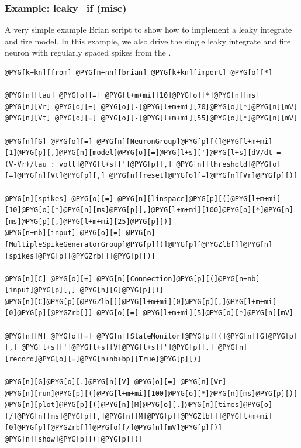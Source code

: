 \documentclass[letterpaper,10pt,english]{manual}
\begin{document}
\resetcurrentobjects
\hypertarget{--doc-examples-misc_leaky_if}{}

\hypertarget{index-49}{}\subsubsection{Example: leaky\_if (misc)}

A very simple example Brian script to show how to implement
a leaky integrate and fire model. In this example, we also
drive the single leaky integrate and fire neuron with
regularly spaced spikes from the \hyperlink{brian.SpikeGeneratorGroup}{}.

\begin{Verbatim}[commandchars=@\[\]]
@PYG[k+kn][from] @PYG[n+nn][brian] @PYG[k+kn][import] @PYG[o][*]

@PYG[n][tau] @PYG[o][=] @PYG[l+m+mi][10]@PYG[o][*]@PYG[n][ms]
@PYG[n][Vr] @PYG[o][=] @PYG[o][-]@PYG[l+m+mi][70]@PYG[o][*]@PYG[n][mV]
@PYG[n][Vt] @PYG[o][=] @PYG[o][-]@PYG[l+m+mi][55]@PYG[o][*]@PYG[n][mV]

@PYG[n][G] @PYG[o][=] @PYG[n][NeuronGroup]@PYG[p][(]@PYG[l+m+mi][1]@PYG[p][,]@PYG[n][model]@PYG[o][=]@PYG[l+s][']@PYG[l+s][dV/dt = -(V-Vr)/tau : volt]@PYG[l+s][']@PYG[p][,] @PYG[n][threshold]@PYG[o][=]@PYG[n][Vt]@PYG[p][,] @PYG[n][reset]@PYG[o][=]@PYG[n][Vr]@PYG[p][)]

@PYG[n][spikes] @PYG[o][=] @PYG[n][linspace]@PYG[p][(]@PYG[l+m+mi][10]@PYG[o][*]@PYG[n][ms]@PYG[p][,]@PYG[l+m+mi][100]@PYG[o][*]@PYG[n][ms]@PYG[p][,]@PYG[l+m+mi][25]@PYG[p][)]
@PYG[n+nb][input] @PYG[o][=] @PYG[n][MultipleSpikeGeneratorGroup]@PYG[p][(]@PYG[p][@PYGZlb[]]@PYG[n][spikes]@PYG[p][@PYGZrb[]]@PYG[p][)]

@PYG[n][C] @PYG[o][=] @PYG[n][Connection]@PYG[p][(]@PYG[n+nb][input]@PYG[p][,] @PYG[n][G]@PYG[p][)]
@PYG[n][C]@PYG[p][@PYGZlb[]]@PYG[l+m+mi][0]@PYG[p][,]@PYG[l+m+mi][0]@PYG[p][@PYGZrb[]] @PYG[o][=] @PYG[l+m+mi][5]@PYG[o][*]@PYG[n][mV]

@PYG[n][M] @PYG[o][=] @PYG[n][StateMonitor]@PYG[p][(]@PYG[n][G]@PYG[p][,] @PYG[l+s][']@PYG[l+s][V]@PYG[l+s][']@PYG[p][,] @PYG[n][record]@PYG[o][=]@PYG[n+nb+bp][True]@PYG[p][)]

@PYG[n][G]@PYG[o][.]@PYG[n][V] @PYG[o][=] @PYG[n][Vr]
@PYG[n][run]@PYG[p][(]@PYG[l+m+mi][100]@PYG[o][*]@PYG[n][ms]@PYG[p][)]
@PYG[n][plot]@PYG[p][(]@PYG[n][M]@PYG[o][.]@PYG[n][times]@PYG[o][/]@PYG[n][ms]@PYG[p][,]@PYG[n][M]@PYG[p][@PYGZlb[]]@PYG[l+m+mi][0]@PYG[p][@PYGZrb[]]@PYG[o][/]@PYG[n][mV]@PYG[p][)]
@PYG[n][show]@PYG[p][(]@PYG[p][)]
\end{Verbatim}
\end{document}
